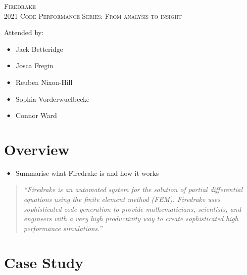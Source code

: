 \documentclass[a4paper,11pt]{article}
\author{Jack Betteridge}
\newenvironment{jacknotes}{\color{red}\renewcommand{\labelitemi}{$\star$}\begin{itemize}}{\end{itemize}}
\begin{document}
\begin{center}
\textsc{\Large Firedrake}\\
\textsc{2021 Code Performance Series: From analysis to insight}
\end{center}

Attended by:
\begin{itemize}
	\item Jack Betteridge
	\item Josca Fregin
	\item Reuben Nixon-Hill
	\item Sophia Vorderwuelbecke
	\item Connor Ward
\end{itemize}

\section{Overview}
\label{sec:overview}
\begin{jacknotes}
	\item Summarise what Firedrake is and how it works
\end{jacknotes}
\begin{quote}
\emph{``Firedrake is an automated system for the solution of partial differential equations using the finite element method (FEM). Firedrake uses sophisticated code generation to provide mathematicians, scientists, and engineers with a very high productivity way to create sophisticated high performance simulations.''}
\end{quote}


\section{Case Study}
\label{sec:case}
\end{document}
